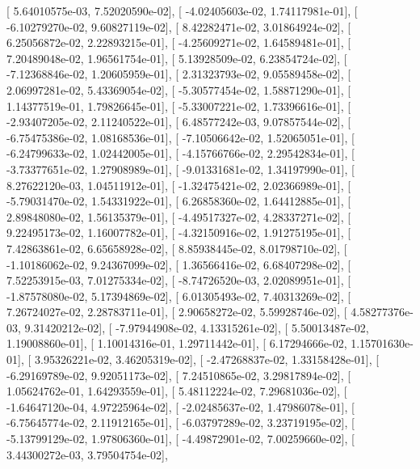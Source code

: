 \documentclass{article}
\begin{document}
       [  5.64010575e-03,   7.52020590e-02],
       [ -4.02405603e-02,   1.74117981e-01],
       [ -6.10279270e-02,   9.60827119e-02],
       [  8.42282471e-02,   3.01864924e-02],
       [  6.25056872e-02,   2.22893215e-01],
       [ -4.25609271e-02,   1.64589481e-01],
       [  7.20489048e-02,   1.96561754e-01],
       [  5.13928509e-02,   6.23854724e-02],
       [ -7.12368846e-02,   1.20605959e-01],
       [  2.31323793e-02,   9.05589458e-02],
       [  2.06997281e-02,   5.43369054e-02],
       [ -5.30577454e-02,   1.58871290e-01],
       [  1.14377519e-01,   1.79826645e-01],
       [ -5.33007221e-02,   1.73396616e-01],
       [ -2.93407205e-02,   2.11240522e-01],
       [  6.48577242e-03,   9.07857544e-02],
       [ -6.75475386e-02,   1.08168536e-01],
       [ -7.10506642e-02,   1.52065051e-01],
       [ -6.24799633e-02,   1.02442005e-01],
       [ -4.15766766e-02,   2.29542834e-01],
       [ -3.73377651e-02,   1.27908989e-01],
       [ -9.01331681e-02,   1.34197990e-01],
       [  8.27622120e-03,   1.04511912e-01],
       [ -1.32475421e-02,   2.02366989e-01],
       [ -5.79031470e-02,   1.54331922e-01],
       [  6.26858360e-02,   1.64412885e-01],
       [  2.89848080e-02,   1.56135379e-01],
       [ -4.49517327e-02,   4.28337271e-02],
       [  9.22495173e-02,   1.16007782e-01],
       [ -4.32150916e-02,   1.91275195e-01],
       [  7.42863861e-02,   6.65658928e-02],
       [  8.85938445e-02,   8.01798710e-02],
       [ -1.10186062e-02,   9.24367099e-02],
       [  1.36566416e-02,   6.68407298e-02],
       [  7.52253915e-03,   7.01275334e-02],
       [ -8.74726520e-03,   2.02089951e-01],
       [ -1.87578080e-02,   5.17394869e-02],
       [  6.01305493e-02,   7.40313269e-02],
       [  7.26724027e-02,   2.28783711e-01],
       [  2.90658272e-02,   5.59928746e-02],
       [  4.58277376e-03,   9.31420212e-02],
       [ -7.97944908e-02,   4.13315261e-02],
       [  5.50013487e-02,   1.19008860e-01],
       [  1.10014316e-01,   1.29711442e-01],
       [  6.17294666e-02,   1.15701630e-01],
       [  3.95326221e-02,   3.46205319e-02],
       [ -2.47268837e-02,   1.33158428e-01],
       [ -6.29169789e-02,   9.92051173e-02],
       [  7.24510865e-02,   3.29817894e-02],
       [  1.05624762e-01,   1.64293559e-01],
       [  5.48112224e-02,   7.29681036e-02],
       [ -1.64647120e-04,   4.97225964e-02],
       [ -2.02485637e-02,   1.47986078e-01],
       [ -6.75645774e-02,   2.11912165e-01],
       [ -6.03797289e-02,   3.23719195e-02],
       [ -5.13799129e-02,   1.97806360e-01],
       [ -4.49872901e-02,   7.00259660e-02],
       [  3.44300272e-03,   3.79504754e-02],
\end{document}
